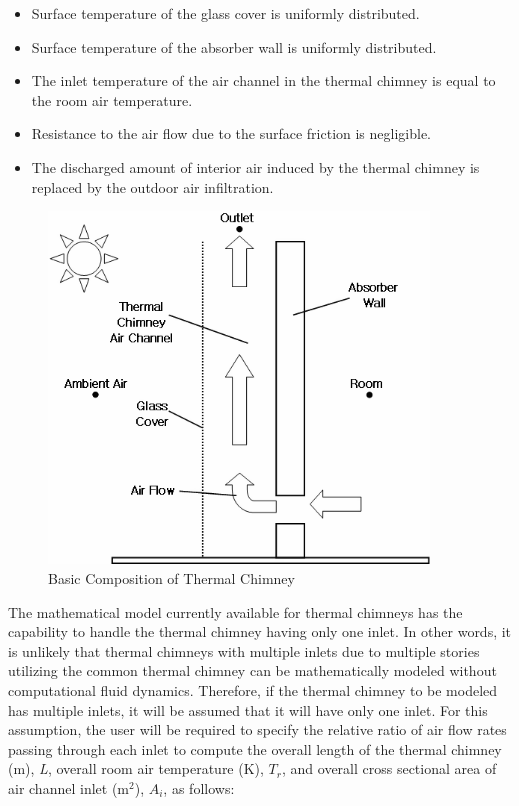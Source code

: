 \begin{itemize}
\item
  Surface temperature of the glass cover is uniformly distributed.
\item
  Surface temperature of the absorber wall is uniformly distributed.
\item
  The inlet temperature of the air channel in the thermal chimney is equal to the room air temperature.
\item
  Resistance to the air flow due to the surface friction is negligible.
\item
  The discharged amount of interior air induced by the thermal chimney is replaced by the outdoor air infiltration.
\end{itemize}

\begin{figure}[hbtp] %
\centering
\includegraphics[width=0.9\textwidth, height=0.9\textheight, keepaspectratio=true]{media/image7454.png}
\caption{Basic Composition of Thermal Chimney \protect \label{fig:basic-composition-of-thermal-chimney}}
\end{figure}

The mathematical model currently available for thermal chimneys has the capability to handle the thermal chimney having only one inlet. In other words, it is unlikely that thermal chimneys with multiple inlets due to multiple stories utilizing the common thermal chimney can be mathematically modeled without computational fluid dynamics. Therefore, if the thermal chimney to be modeled has multiple inlets, it will be assumed that it will have only one inlet. For this assumption, the user will be required to specify the relative ratio of air flow rates passing through each inlet to compute the overall length of the thermal chimney (m), \emph{L}, overall room air temperature (K), \(T_{r}\), and overall cross sectional area of air channel inlet (m\(^{2}\)), \(A_{i}\), as follows:

